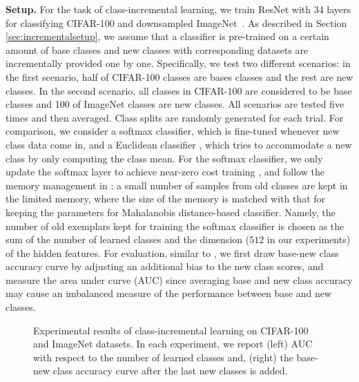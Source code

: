 \documentclass{article}
\begin{document}
{\bf Setup.} 
For the task of class-incremental learning, we train ResNet with 34 layers for classifying CIFAR-100 and downsampled ImageNet~\citep{chrabaszcz2017downsampled}.
As described in Section \ref{sec:incrementalsetup}, we assume that a classifier is pre-trained on a certain amount of base classes and new classes with corresponding datasets are incrementally provided one by one.
Specifically, we test two different scenarios:
in the first scenario, half of CIFAR-100 classes are bases classes and the rest are new classes.
In the second scenario, all classes in CIFAR-100 are considered to be base classes and 100 of ImageNet classes are new classes.
All scenarios are tested five times and then averaged.
Class splits are randomly generated for each trial.
For comparison, we consider a softmax classifier, which is fine-tuned whenever new class data come in, and a Euclidean classifier \citep{mensink2013distance}, which tries to accommodate a new class by only computing the class mean.
For the softmax classifier,
we only update the softmax layer to achieve near-zero cost training \citep{mensink2013distance}, and follow the memory management in \citet{rebuffi2017icarl}:
a small number of samples from old classes are kept in the limited memory, where the size of the memory is matched with that for keeping the parameters for Mahalanobis distance-based classifier.
Namely, the number of old exemplars kept for training the softmax classifier is chosen as the sum of the number of learned classes and the dimension ($512$ in our experiments) of the hidden features. For evaluation, similar to \citep{lee2018hierarchical}, we first draw base-new class accuracy curve by adjusting an additional bias to the new class scores, and measure the area under curve (AUC) since averaging base and new class accuracy may cause an imbalanced measure of the performance between base and new classes.



\begin{figure*} [t] \centering\setlength{\tabcolsep}{0cm}
\caption{Experimental results of class-incremental learning on CIFAR-100 and ImageNet datasets.
In each experiment,
we report (left) AUC with respect to the number of learned classes and, 
(right) the base-new class accuracy curve after the last new classes is added.}
\label{fig:incremental}
\end{figure*}
\end{document}

